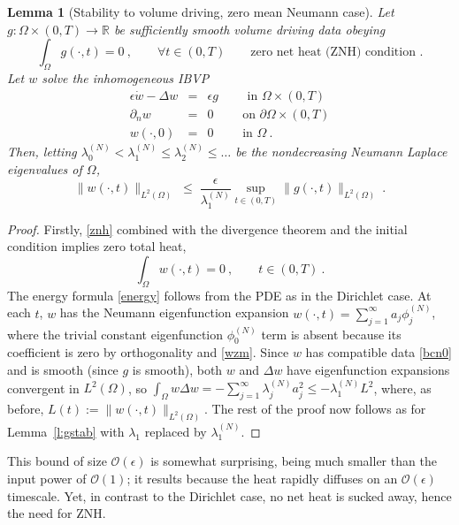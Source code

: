 \documentclass[10pt]{article}
\newcommand{\be}{\begin{equation}}
\newcommand{\ee}{\end{equation}}
\newcommand{\bea}{\begin{eqnarray}}
\newcommand{\eea}{\end{eqnarray}}
\newcommand{\R}{\mathbb{R}}
\newcommand{\bigO}{{\mathcal O}}
\newtheorem{lem}[thm]{Lemma}
\newcommand{\pO}{{\partial\Omega}}
\newcommand{\eps}{\epsilon}
\newcommand{\dn}{\partial_n}
\newcommand{\LTO}{{L^2(\Omega)}}
\begin{document}
\begin{lem}[Stability to volume driving, zero mean Neumann case]
  Let $g: \Omega\times(0,T) \to\R$ be sufficiently smooth
  volume driving data obeying
  \be
  \int_\Omega g(\cdot,t)=0~, \qquad \forall t\in(0,T)
  \qquad\mbox{zero net heat (ZNH) condition~.}
  \label{znh}
  \ee
  Let $w$ solve the inhomogeneous IBVP
  \bea
  \eps\dot{w} - \Delta w &=& \eps g    \qquad \mbox{ in } \Omega\times (0,T)
  \\
  \dn w  &=& 0  \qquad \mbox{ on } \pO \times (0,T)
  \label{bcn0}
  \\
  w(\cdot, 0)    &=&  0 \qquad \mbox{ in } \Omega~.
  \eea
  Then, letting $\lambda_0^{(N)}<
  \lambda_1^{(N)} \le \lambda_2^{(N)} \le \dots$
  be the nondecreasing Neumann Laplace eigenvalues of $\Omega$,
  \be
  \|w(\cdot,t)\|_\LTO \;\le\;
  \frac{\eps}{\lambda_1^{(N)}} \sup_{t\in(0,T)} \|g(\cdot,t)\|_\LTO
  ~.
  \label{gstabn}
  \ee
  \label{l:gstabn}
\end{lem}
\begin{proof}
  Firstly, \eqref{znh} combined with the divergence theorem
  and the initial condition implies zero total heat,
  \be
  \int_\Omega w(\cdot,t) = 0 ~, \qquad t \in (0,T)~.
  \label{wzm}
  \ee
  The energy formula \eqref{energy} follows from the PDE
  as in the Dirichlet case.
  At each $t$, $w$ has the Neumann eigenfunction expansion
  $w(\cdot,t) = \sum_{j=1}^\infty a_j \phi_j^{(N)}$, where the
  trivial constant eigenfunction $\phi_0^{(N)}$ term
  is absent because its coefficient is zero by orthogonality and \eqref{wzm}.
  Since $w$ has compatible data \eqref{bcn0} and is smooth
  (since $g$ is smooth),
  both $w$ and $\Delta w$ have eigenfunction expansions convergent
  in $\LTO$, so
  $\int_\Omega w \Delta w = -\sum_{j=1}^\infty \lambda_j^{(N)} a_j^2 \le
  -\lambda_1^{(N)} L^2$,
  where, as before, $L(t) := \|w(\cdot,t)\|_\LTO$.
  The rest of the proof now follows as for Lemma~\ref{l:gstab}
  with $\lambda_1$ replaced by $\lambda_1^{(N)}$.
  \end{proof}

This bound of size $\bigO(\eps)$ is somewhat surprising, being 
much smaller than the input power of $\bigO(1)$;
it results because the heat rapidly diffuses
on an $\bigO(\eps)$ timescale.
Yet, in contrast to the Dirichlet case, no net heat is sucked away, hence
the need for ZNH.
\end{document}
